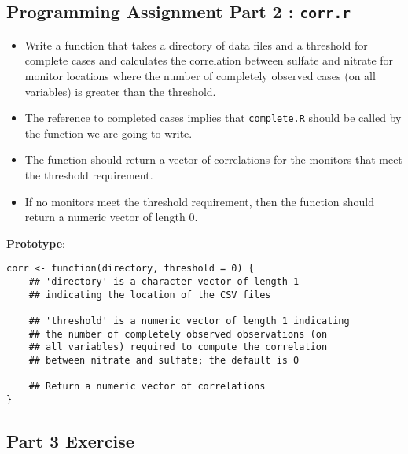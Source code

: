 \documentclass[]{article}
\begin{document}
 
\subsection{Programming Assignment Part 2 : \texttt{corr.r} }
\begin{itemize}

\item Write a function that takes a directory of data files and a threshold for complete cases and calculates the correlation between sulfate and nitrate for monitor locations where the number of completely observed cases (on all variables) is greater than the threshold. \item The reference to completed cases implies that \texttt{complete.R} should be called by the function we are going to write. \item The function should return a vector of correlations for the monitors that meet the threshold requirement. \item If no monitors meet the threshold requirement, then the function should return a numeric vector of length 0.
\end{itemize}

\textbf{Prototype}: 
\begin{framed}
\begin{verbatim}
corr <- function(directory, threshold = 0) {
    ## 'directory' is a character vector of length 1 
    ## indicating the location of the CSV files

    ## 'threshold' is a numeric vector of length 1 indicating
    ## the number of completely observed observations (on 
    ## all variables) required to compute the correlation 
    ## between nitrate and sulfate; the default is 0

    ## Return a numeric vector of correlations
}
\end{verbatim}
\end{framed}
\newpage

\subsection{Part 3 Exercise}
\end{document}
